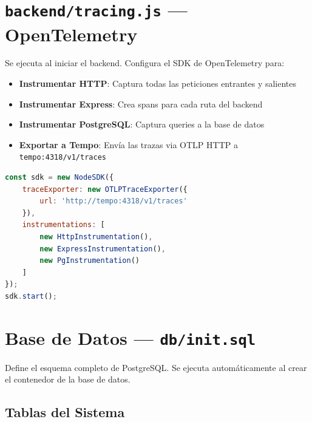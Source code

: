 \documentclass[12pt,oneside]{article}
\begin{document}
\section{\texttt{backend/tracing.js} — OpenTelemetry}

Se ejecuta al iniciar el backend. Configura el SDK de OpenTelemetry para:

\begin{itemize}
    \item \textbf{Instrumentar HTTP}: Captura todas las peticiones entrantes y salientes
    \item \textbf{Instrumentar Express}: Crea spans para cada ruta del backend
    \item \textbf{Instrumentar PostgreSQL}: Captura queries a la base de datos
    \item \textbf{Exportar a Tempo}: Envía las trazas via OTLP HTTP a \texttt{tempo:4318/v1/traces}
\end{itemize}

\begin{lstlisting}[language=JavaScript, caption=tracing.js simplificado]
const sdk = new NodeSDK({
    traceExporter: new OTLPTraceExporter({
        url: 'http://tempo:4318/v1/traces'
    }),
    instrumentations: [
        new HttpInstrumentation(),
        new ExpressInstrumentation(),
        new PgInstrumentation()
    ]
});
sdk.start();
\end{lstlisting}

\section{Base de Datos — \texttt{db/init.sql}}

Define el esquema completo de PostgreSQL. Se ejecuta automáticamente al crear el contenedor de la base de datos.

\subsection{Tablas del Sistema}
\end{document}
